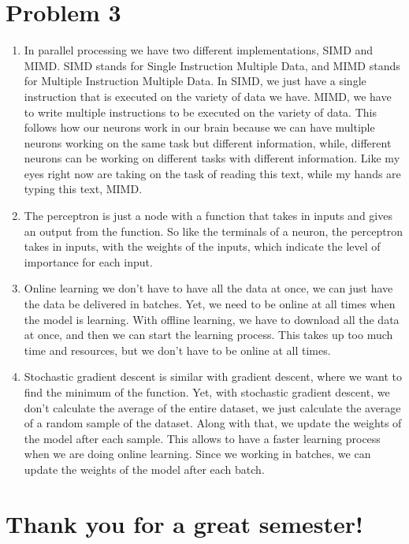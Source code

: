 \documentclass{article}
\begin{document}
\section*{Problem 3}
\begin{enumerate}
    \item In parallel processing we have two different implementations, SIMD and MIMD. SIMD stands for Single Instruction Multiple Data, and MIMD stands for Multiple Instruction Multiple Data. 
    In SIMD, we just have a single instruction that is executed on the variety of data we have. MIMD, we have to write multiple instructions to be executed on the variety of data. 
    This follows how our neurons work in our brain because we can have multiple neurons working on the same task but different information, while, different neurons can be working on different tasks with different information. 
    Like my eyes right now are taking on the task of reading this text, while my hands are typing this text, MIMD. 
    \item The perceptron is just a node with a function that takes in inputs and gives an output from the function. So like the terminals of a neuron, 
    the perceptron takes in inputs, with the weights of the inputs, which indicate the level of importance for each input.
    \item Online learning we don't have to have all the data at once, we can just have the data be delivered in batches. Yet, we need to be online at all times when the model is learning. With offline learning, we have to download all the data at once, and then we can start the learning process. 
    This takes up too much time and resources, but we don't have to be online at all times.
    \item Stochastic gradient descent is similar with gradient descent, where we want to find the minimum of the function. Yet, with stochastic gradient descent, we don't calculate the average of the entire dataset, we just calculate the average of a random sample of the dataset. Along with that, we update the weights of the model after each sample.
    This allows to have a faster learning process when we are doing online learning. Since we working in batches, we can update the weights of the model after each batch.
\end{enumerate}

\section*{Thank you for a great semester!}
\end{document}
